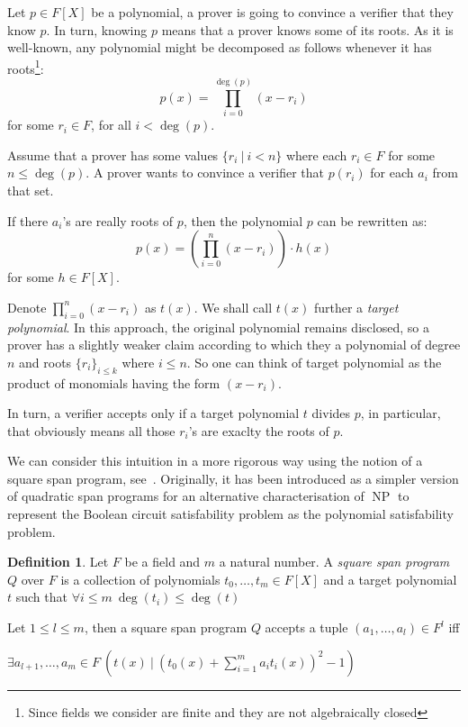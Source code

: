 \documentclass{article}
\theoremstyle{definition}
\newtheorem{definition}{Definition}[section]
\theoremstyle{remark}
\begin{document}
Let $p \in F[X]$ be a polynomial, a prover is going to convince a verifier that they know $p$. In turn, knowing $p$ means that a prover knows some of its roots. As it is well-known,
any polynomial might be decomposed as follows whenever it has roots\footnote{Since fields we consider are finite and they are not algebraically closed}:
\begin{equation}
p(x) = \prod_{i = 0}^{\deg(p)} (x - r_i)
\end{equation}
for some $r_i \in F$, for all $i < \deg(p)$.

Assume that a prover has some values $\{ r_i \: | \: i < n\}$ where each $r_i \in F$ for some $n \leq \deg(p)$.
A prover wants to convince a verifier that $p(r_i)$ for each $a_i$ from that set.

If there $a_i$'s are really roots of $p$, then the polynomial $p$ can be rewritten as:
\begin{equation}
p(x) = \left( \prod_{i = 0}^n (x - r_i) \right) \cdot h(x)
\end{equation}
for some $h \in F[X]$.

Denote $\prod_{i = 0}^n (x - r_i)$ as $t(x)$. We shall call $t(x)$ further a \emph{target polynomial}.
In this approach, the original polynomial remains disclosed, so a prover has a slightly weaker claim according to
which they a polynomial of degree $n$ and roots $\{r_i\}_{i \leq k}$ where $i \leq n$. So one can think of target polynomial as the product of monomials having the form $(x - r_i)$.

In turn, a verifier accepts only if a target polynomial $t$ divides $p$, in particular, that obviously means all those $r_i$'s are exaclty the roots of $p$.

We can consider this intuition in a more rigorous way using the notion of a square span program, see~\cite{danezis2014square}.
Originally, it has been introduced as a simpler version of quadratic span programs for an alternative characterisation of $\operatorname{NP}$
to represent the Boolean circuit satisfability problem as the polynomial satisfability problem.

\begin{definition}
Let $F$ be a field and $m$ a natural number. A \emph{square span program} $Q$ over $F$ is a
collection of polynomials $t_0, \dots, t_m \in F[X]$ and a target polynomial $t$
such that $\forall i \leq m \: \deg(t_i) \leq \deg(t)$

Let $1 \leq l \leq m$, then a square span program $Q$ accepts a tuple $(a_1, \dots, a_l) \in F^l$ iff

\begin{center}
$\exists a_{l + 1}, \dots, a_m \in F \: \left( t(x) \: | \: {\left( t_0(x) + \sum \limits_{i = 1}^m a_i t_i(x) \right)}^2 - 1 \right)$
\end{center}
\end{definition}
\end{document}
